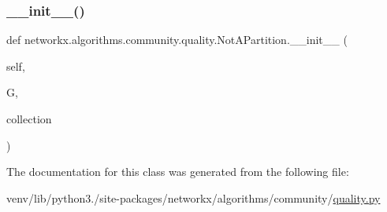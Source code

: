 \subsubsection{\texorpdfstring{\+\_\+\+\_\+init\+\_\+\+\_\+()}{\_\_init\_\_()}}
{\footnotesize\ttfamily def networkx.\+algorithms.\+community.\+quality.\+Not\+A\+Partition.\+\_\+\+\_\+init\+\_\+\+\_\+ (\begin{DoxyParamCaption}\item[{}]{self,  }\item[{}]{G,  }\item[{}]{collection }\end{DoxyParamCaption})}



The documentation for this class was generated from the following file\+:\begin{DoxyCompactItemize}
\item 
venv/lib/python3./site-\/packages/networkx/algorithms/community/\hyperlink{quality_8py}{quality.\+py}\end{DoxyCompactItemize}
